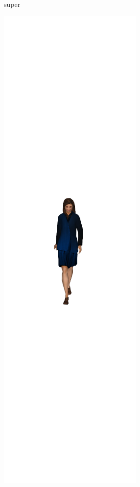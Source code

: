\begin{figure}[h]
\begin{subfigure}[b]{.22\textwidth}
    \caption{super}
    \label{fig:woman0}
  \end{subfigure}%
  \begin{subfigure}[b]{.22\textwidth}
    \includegraphics[width=\textwidth]{figures/woman/cropped/1.png}

\end{subfigure}
\end{figure}
